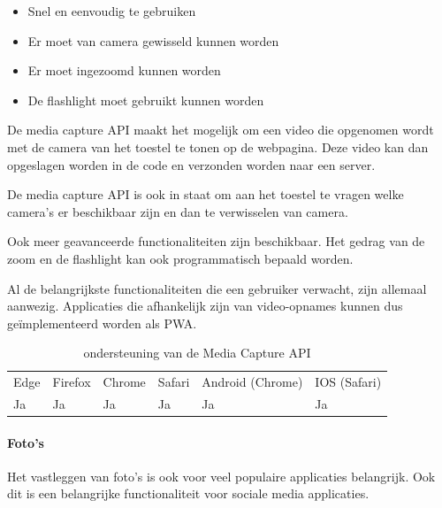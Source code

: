    \begin{itemize}
     \item	Snel en eenvoudig te gebruiken
     \item	Er moet van camera gewisseld kunnen worden
     \item	Er moet ingezoomd kunnen worden
     \item	De flashlight moet gebruikt kunnen worden
   \end{itemize}

De media capture API \autocite{DzungDTran}  maakt het mogelijk om een video die opgenomen wordt met de camera van het toestel te tonen op de webpagina. Deze video kan dan opgeslagen worden in de code en verzonden worden naar een server. 

\autocite{Fransson2017}

De media capture API is ook in staat om aan het toestel te vragen welke camera’s er beschikbaar zijn en dan te verwisselen van camera.

\autocite{Scales2020a}

Ook meer geavanceerde functionaliteiten zijn beschikbaar. Het gedrag van de zoom en de flashlight kan ook programmatisch bepaald worden.

\autocite{Oberhofer2017} \autocite{Ogundipe2018}


Al de belangrijkste functionaliteiten die een gebruiker verwacht, zijn allemaal aanwezig. Applicaties die afhankelijk zijn van video-opnames kunnen dus geïmplementeerd worden als PWA.

\begin{table}[H]
	\centering
	\begin{tabular}{llllll}
		Edge & Firefox & Chrome & Safari & Android (Chrome) & IOS (Safari) \\
		Ja   & Ja      & Ja     & Ja     & Ja               & Ja          
	\end{tabular}	
	\caption{ondersteuning van de Media Capture API}
	\label{ondersteuning van de Media Capture API}
\end{table}



\paragraph{Foto's }

Het vastleggen van foto’s is ook voor veel populaire applicaties belangrijk. Ook dit is een belangrijke functionaliteit voor sociale media applicaties.

